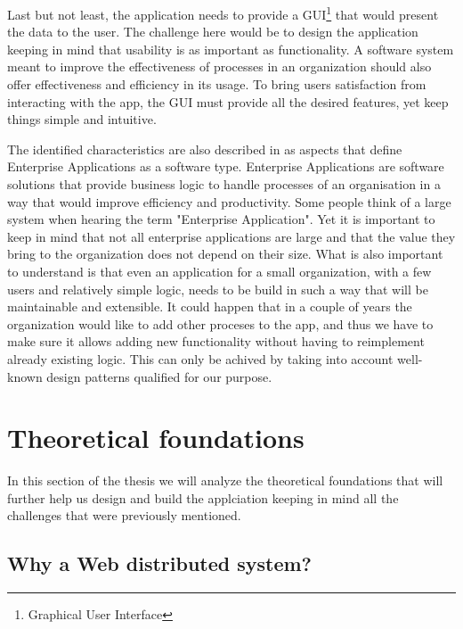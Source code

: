 Last but not least, the application needs to provide a GUI\footnote{Graphical User Interface} that would present the data to the user. The challenge here would be to design the application keeping in mind that usability is as important as functionality. A software system meant to improve the effectiveness of processes in an organization should also offer effectiveness and efficiency in its usage. To bring users satisfaction from interacting with the app, the GUI must provide all the desired features, yet keep things simple and intuitive.

The identified characteristics are also described in \cite{patternsOfEnterpriseApplicationArchitecture} as aspects that define Enterprise Applications as a software type. Enterprise Applications are software solutions that provide business logic to handle processes of an organisation in a way that would improve efficiency and productivity. Some people think of a large system when hearing the term "Enterprise Application". Yet it is important to keep in mind that not all enterprise applications are large and that the value they bring to the organization does not depend on their size. What is also important to understand is that even an application for a small organization, with a few users and relatively simple logic, needs to be build in such a way that will be maintainable and extensible. It could happen that in a couple of years the organization would like to add other proceses to the app, and thus we have to make sure it allows adding new functionality without having to reimplement already existing logic. This can only be achived by taking into account well-known design patterns qualified for our purpose.



\section{Theoretical foundations}
\label{section:theoreticalFoundations}

In this section of the thesis we will analyze the theoretical foundations that will further help us design and build the applciation keeping in mind all the challenges that were previously mentioned.


\subsection{Why a Web distributed system?}
\label{subsection:whyAWebDistributedSystem}


